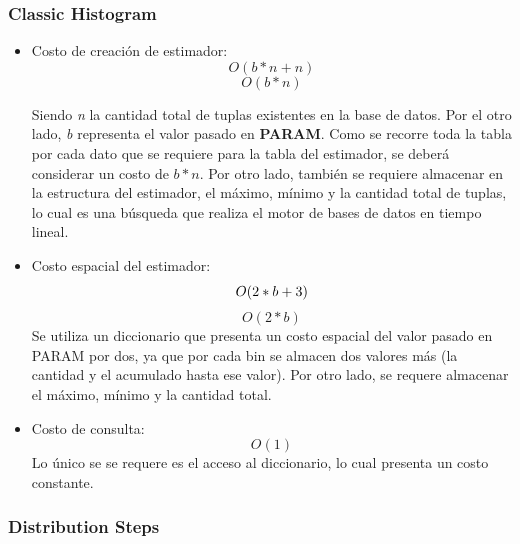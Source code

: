 \documentclass[10pt, a4paper,english,spanish,hidelinks]{article}
\begin{document}
\subsubsection{Classic Histogram}
\begin{itemize}

\item Costo de creación de estimador:
\begin{equation}
O(b * n + n )
\end{equation}
\begin{equation}
O(b * n)
\end{equation}

Siendo \textit{n} la cantidad total de tuplas existentes en la base de datos.
Por el otro lado, \textit{b} representa el valor pasado en \textbf{PARAM}.
Como se recorre toda la tabla por cada dato que se requiere para la tabla del estimador,
se deberá considerar un costo de $b * n$. Por otro lado, también se requiere almacenar en
la estructura del estimador, el máximo, mínimo y la cantidad total de tuplas, lo cual es
una búsqueda que realiza el motor de bases de datos en tiempo lineal.

\item Costo espacial del estimador:
\begin{equation}
O(2 * b + 3 ) \\
\end{equation}
\begin{equation}
O(2 * b)
\end{equation}
Se utiliza un diccionario que presenta un costo espacial del valor pasado en PARAM por dos,
ya que por cada bin se almacen dos valores más (la cantidad y el acumulado hasta ese valor).
Por otro lado, se requere almacenar el máximo, mínimo y la cantidad total.

\item Costo de consulta:
\begin{equation}
O(1)
\end{equation}
Lo único se se requere es el acceso al diccionario, lo cual presenta un costo constante.

\end{itemize}
\subsubsection{Distribution Steps}
\end{document}
